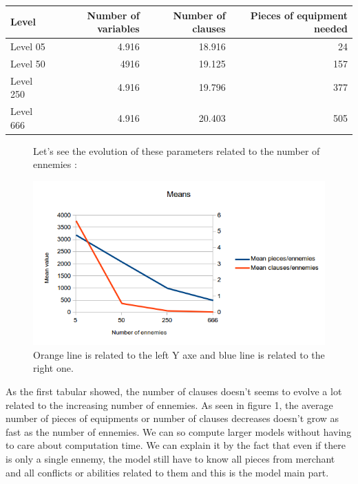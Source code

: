 \begin{description}
\begin{tabular}{|l|r|r|r|}
\hline
Level & Number of variables & Number of clauses & Pieces of equipment needed\\
\hline
Level 05 & 4.916 & 18.916 & 24\\
Level 50 & 4916 & 19.125 & 157\\
Level 250 & 4.916 & 19.796 & 377 \\
Level 666 & 4.916 & 20.403 & 505\\
\hline
\end{tabular}



\begin{figure}[ht!]
Let's see the evolution of these parameters related to the number of ennemies :\\
\begin{center}
\includegraphics[scale=0.6]{mean.png}
\caption{Orange line is related to the left Y axe and blue line is related to the right one.}\end{center}
\end{figure}


As the first tabular showed, the number of clauses doesn't seems to evolve a lot related to the increasing number of ennemies. As seen in figure 1, the average number of pieces of equipments or number of clauses decreases doesn't grow as fast as the number of ennemies. We can so compute larger models without having to care about computation time. We can explain it by the fact that even if there is only a single ennemy, the model still have to know all pieces from merchant and all conflicts or abilities related to them and this is the model main part.


\end{description}





